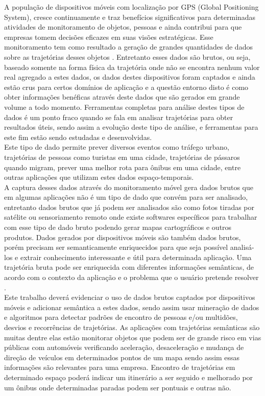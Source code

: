 \documentclass[	12pt, Times, openright, twoside, a4paper, english, brazil]{abntex2}
\begin{document}
A população de dispositivos móveis com localização por GPS (Global Positioning System), cresce continuamente e traz benefícios significativos para determinadas atividades de monitoramento de objetos, pessoas e ainda contribui para que empresas tomem decisões eficazes em suas visões estratégicas. Esse monitoramento tem como resultado a geração de grandes quantidades de dados sobre as trajetórias desses objetos \cite{Spaccapietra2008}. Entretanto esses dados são brutos, ou seja, baseado somente na forma física da trajetória onde não se encontra nenhum valor real agregado a estes dados, os dados destes dispositivos foram captados e ainda estão crus para certos domínios de aplicação e a questão entorno disto é como obter informações benéficas através deste dados que são gerados em grande volume a todo momento. Ferramentas completas para análise destes tipos de dados é um ponto fraco quando se fala em analisar trajetórias para obter resultados úteis, sendo assim a evolução deste tipo de análise, e ferramentas para este fim estão sendo estudadas e desenvolvidas.\\
\indent Este tipo de dado permite prever diversos eventos como tráfego urbano, trajetórias de pessoas como turistas em uma cidade, trajetórias de pássaros quando migram, prever uma melhor rota para ônibus em uma cidade, entre outras aplicações que utilizam estes dados espaço-temporais.\\
\indent A captura desses dados através do monitoramento móvel gera dados brutos que em algumas aplicações não é um tipo de dado que convém para ser analisado, entretanto dados brutos que já podem ser analisados são como fotos tiradas por satélite ou sensoriamento remoto onde existe softwares específicos para trabalhar com esse tipo de dado bruto podendo gerar mapas cartográficos e outros produtos. Dados gerados por dispositivos móveis são também dados brutos, porém precisam ser semanticamente enriquecidos para que seja possível analisá-los e extrair conhecimento interessante e útil para determinada aplicação. Uma trajetória bruta pode ser enriquecida com diferentes informações semânticas, de acordo com o contexto da aplicação e o problema que o usuário pretende resolver \cite{Bogorny2008}.\\
\indent Este trabalho deverá evidenciar o uso de dados brutos captados por dispositivos móveis e adicionar semântica a estes dados, sendo assim usar mineração de dados e algoritmos para detectar padrões de encontro de pessoas e/ou multidões, desvios e recorrências de trajetórias. As aplicações com trajetórias semânticas são muitas dentre elas estão monitorar objetos que podem ser de grande risco em vias públicas com automóveis verificando aceleração, desaceleração e mudança de direção de veículos em determinados pontos de um mapa sendo assim essas informações são relevantes para uma empresa. Encontro de trajetórias em determinado espaço poderá indicar um itinerário a ser seguido e melhorado por um ônibus onde determinadas paradas podem ser pontuais e outras não.
\end{document}
